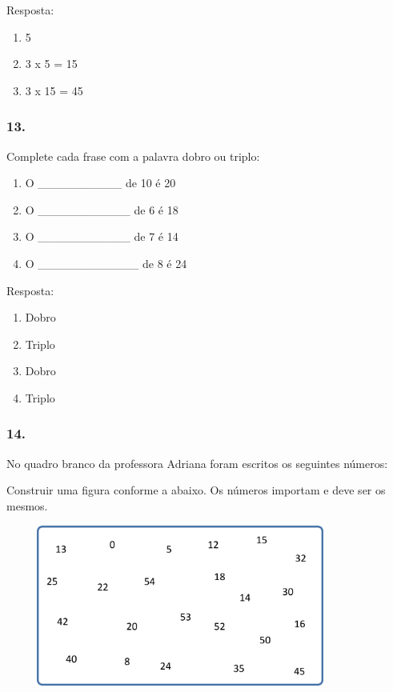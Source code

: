 Resposta:

\begin{enumerate}
\def\labelenumi{\alph{enumi})}
\item
  5
\item
  3 x 5 = 15
\item
  3 x 15 = 45
\end{enumerate}

\subsubsection{13.}\label{section-28}

Complete cada frase com a palavra dobro ou triplo:

\begin{enumerate}
\def\labelenumi{\alph{enumi})}
\item
  O \_\_\_\_\_\_\_\_\_\_ de 10 é 20
\item
  O \_\_\_\_\_\_\_\_\_\_\_ de 6 é 18
\item
  O \_\_\_\_\_\_\_\_\_\_\_ de 7 é 14
\item
  O \_\_\_\_\_\_\_\_\_\_\_\_ de 8 é 24
\end{enumerate}

Resposta:

\begin{enumerate}
\def\labelenumi{\alph{enumi})}
\item
  Dobro
\item
  Triplo
\item
  Dobro
\item
  Triplo
\end{enumerate}

\subsubsection{14.}\label{section-29}

No quadro branco da professora Adriana foram escritos os seguintes
números:

Construir uma figura conforme a abaixo. Os números importam e deve ser
os mesmos.

\includegraphics[width=4.51706in,height=2.09185in]{media/image25.png}

